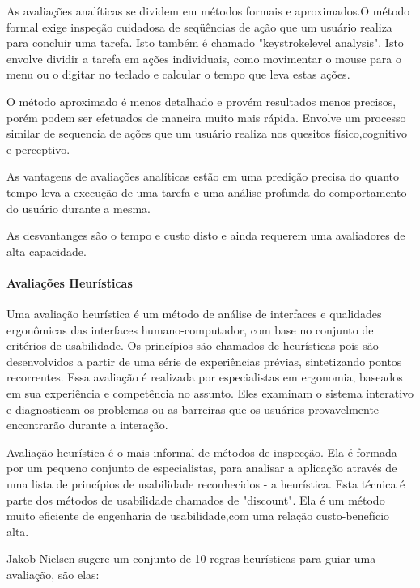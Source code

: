 As avaliações analíticas se dividem em métodos formais e aproximados.O método formal exige inspeção cuidadosa de seqüências de ação que um usuário realiza para concluir uma tarefa. Isto também é chamado "keystrokelevel analysis". Isto envolve dividir a tarefa em ações individuais, como movimentar o mouse para o menu ou o digitar no teclado e calcular o tempo que leva estas ações. 

O método aproximado é menos detalhado e provém resultados menos precisos, porém podem ser efetuados de maneira muito mais rápida. Envolve um processo similar de sequencia de ações que um usuário realiza nos quesitos físico,cognitivo e perceptivo. 

As vantagens de avaliações analíticas estão em uma predição precisa do quanto tempo leva a execução de uma tarefa e uma análise profunda do comportamento do usuário durante a mesma.

As desvantanges são o tempo e custo disto e ainda requerem uma avaliadores de alta capacidade.
\cite{andreas_holzinger}

\paragraph{Avaliações Heurísticas}

Uma avaliação heurística é um método de análise de interfaces e qualidades ergonômicas das interfaces humano-computador, com base no conjunto de critérios de usabilidade.  Os princípios são chamados de heurísticas pois são desenvolvidos a partir de uma série de experiências prévias, sintetizando pontos recorrentes. Essa avaliação é realizada por especialistas em ergonomia, baseados em sua experiência e competência no assunto. Eles examinam o sistema interativo e diagnosticam os problemas ou as barreiras que os usuários provavelmente encontrarão durante a interação.
\cite{cybil_apostila}

Avaliação heurística é o mais informal de métodos de inspecção. Ela é formada por um pequeno conjunto de especialistas, para analisar a aplicação através de uma lista de princípios de usabilidade reconhecidos - a heurística. Esta técnica é
parte dos métodos de usabilidade chamados de "discount". Ela é um método muito eficiente de engenharia de usabilidade,com uma relação custo-benefício alta.

Jakob Nielsen sugere um conjunto de 10 regras heurísticas para guiar uma avaliação, são elas:

